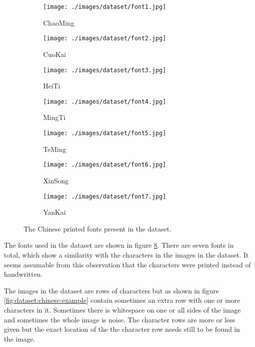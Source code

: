\begin{figure}[ht]
  \centering
  \begin{subfigure}{0.13\textwidth}
    \centering
    \texttt{[image: ./images/dataset/font1.jpg]}
    \caption{ChaoMing}
    \label{fig:dataset:font:1}
  \end{subfigure}
  \begin{subfigure}{0.13\textwidth}
    \centering
    \texttt{[image: ./images/dataset/font2.jpg]}
    \caption{CuoKai}
    \label{fig:dataset:font:2}
  \end{subfigure}
  \begin{subfigure}{0.13\textwidth}
    \centering
    \texttt{[image: ./images/dataset/font3.jpg]}
    \caption{HeiTi}
    \label{fig:dataset:font:3}
  \end{subfigure}
  \begin{subfigure}{0.13\textwidth}
    \centering
    \texttt{[image: ./images/dataset/font4.jpg]}
    \caption{MingTi}
    \label{fig:dataset:font:4}
  \end{subfigure}
  \begin{subfigure}{0.13\textwidth}
    \centering
    \texttt{[image: ./images/dataset/font5.jpg]}
    \caption{TeMing}
    \label{fig:dataset:font:5}
  \end{subfigure}
  \begin{subfigure}{0.13\textwidth}
    \centering
    \texttt{[image: ./images/dataset/font6.jpg]}
    \caption{XinSong}
    \label{fig:dataset:font:6}
  \end{subfigure}
  \begin{subfigure}{0.13\textwidth}
    \centering
    \texttt{[image: ./images/dataset/font7.jpg]}
    \caption{YanKai}
    \label{fig:dataset:font:7}
  \end{subfigure}
  \caption{The Chinese printed fonts present in the dataset.}
  \label{fig:dataset:fonts}
\end{figure}

The fonts used in the dataset are shown in figure \ref{fig:dataset:fonts}. There are seven fonts in total, which show a similarity with the characters in the images in the dataset. It seems assumable from this observation that the characters were printed instead of handwritten.

The images in the dataset are rows of characters but as shown in figure \ref{fig:dataset:chinese:example} contain sometimes an extra row with one or more characters in it. Sometimes there is whitespace on one or all sides of the image and sometimes the whole image is noise. The character rows are more or less given but the exact location of the the character row needs still to be found in the image.

